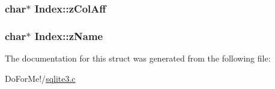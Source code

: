 \hypertarget{struct_index_af076df9f74dd836001c0a59d27274c0e}{
\subsubsection[{z\-Col\-Aff}]{\setlength{\rightskip}{0pt plus 5cm}char$\ast$ Index\-::z\-Col\-Aff}}\label{struct_index_af076df9f74dd836001c0a59d27274c0e}
\hypertarget{struct_index_a8848cddf6e09f22e3b794ec019082ced}{
\subsubsection[{z\-Name}]{\setlength{\rightskip}{0pt plus 5cm}char$\ast$ Index\-::z\-Name}}\label{struct_index_a8848cddf6e09f22e3b794ec019082ced}


The documentation for this struct was generated from the following file\-:\begin{DoxyCompactItemize}
\item 
Do\-For\-Me!/\hyperlink{sqlite3_8c}{sqlite3.\-c}\end{DoxyCompactItemize}
